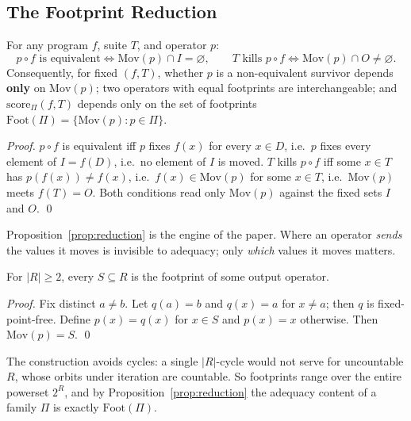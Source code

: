 \documentclass[runningheads,envcountsect,envcountsame]{llncs}
\newcommand{\Mov}{\mathrm{Mov}}
\newcommand{\Foot}{\mathrm{Foot}}
\newcommand{\score}{\mathrm{score}}
\begin{document}
\subsection{The Footprint Reduction}

\begin{proposition}
\label{prop:reduction}
For any program $f$, suite $T$, and operator $p$:
\[
  p \circ f \text{ is equivalent} \iff \Mov(p) \cap I = \varnothing,
  \qquad
  T \text{ kills } p \circ f \iff \Mov(p) \cap O \neq \varnothing.
\]
Consequently, for fixed $(f,T)$, whether $p$ is a non-equivalent survivor depends
\textbf{only} on $\Mov(p)$; two operators with equal footprints are
interchangeable; and $\score_\Pi(f,T)$ depends only on the set of footprints
$\Foot(\Pi) = \{\Mov(p) : p \in \Pi\}$.
\end{proposition}

\begin{proof}
$p \circ f$ is equivalent iff $p$ fixes $f(x)$ for every $x \in D$, i.e.\ $p$
fixes every element of $I = f(D)$, i.e.\ no element of $I$ is moved. $T$ kills
$p \circ f$ iff some $x \in T$ has $p(f(x)) \neq f(x)$, i.e.\ $f(x) \in \Mov(p)$
for some $x \in T$, i.e.\ $\Mov(p)$ meets $f(T) = O$. Both conditions read only
$\Mov(p)$ against the fixed sets $I$ and $O$. \qed
\end{proof}

Proposition~\ref{prop:reduction} is the engine of the paper. Where an operator
\emph{sends} the values it moves is invisible to adequacy; only \emph{which}
values it moves matters.

\begin{proposition}
\label{prop:surj}
For $|R| \ge 2$, every $S \subseteq R$ is the footprint of some output operator.
\end{proposition}

\begin{proof}
Fix distinct $a \neq b$. Let $q(a) = b$ and $q(x) = a$ for $x \neq a$; then $q$ is
fixed-point-free. Define $p(x) = q(x)$ for $x \in S$ and $p(x) = x$ otherwise.
Then $\Mov(p) = S$. \qed
\end{proof}

The construction avoids cycles: a single $|R|$-cycle would not serve for
uncountable $R$, whose orbits under iteration are countable. So footprints range
over the entire powerset $2^R$, and by Proposition~\ref{prop:reduction} the
adequacy content of a family $\Pi$ is exactly $\Foot(\Pi)$.
\end{document}
